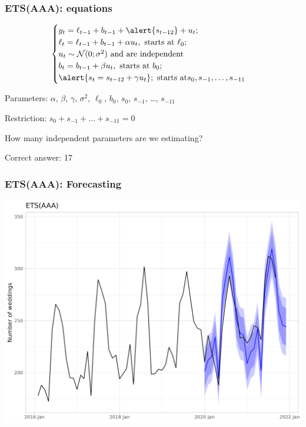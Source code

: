 \begin{frame}
	\frametitle{ETS(AAA): equations}
	
	
	\[
	\begin{cases}
		y_t = \ell_{t-1} + b_{t-1} + \alert{s_{t-12}} + u_t; \\
		\ell_t = \ell_{t-1} + b_{t-1} + \alpha u_t, \text{ starts at } \ell_0; \\
		u_t \sim \dN(0;\sigma^2) \text{ and are independent} \\
		b_t = b_{t-1} + \beta u_t,\text{ starts at } b_0; \\
		\alert{s_t = s_{t-12} + \gamma u_t}; \text{ starts at} s_0, s_{-1}, \ldots, s_{-11}
	\end{cases}
	\]
	
	
	Parameters: $\alpha$, $\beta$, $\gamma$, $\sigma^2$, $\ell_0$, $b_0$, $s_0$, $s_{-1}$, \ldots, $s_ {-11}$
	
	\alert{Restriction}: $s_0 + s_{-1} + \ldots + s_{-11} = 0$
	
	\pause
	
	How many independent parameters are we estimating?
	
	\pause
	
	Correct answer: 17
	
	
\end{frame}



\begin{frame}
	\frametitle{ETS(AAA): Forecasting}
	
	\includegraphics[width=\textwidth]{pictures/om_ts_02-076.png}
	
	
\end{frame}


